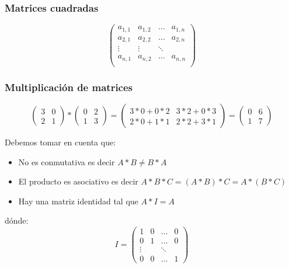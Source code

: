 \subsubsection{Matrices cuadradas}
\[
    \begin{pmatrix}
        a_{1,1} & a_{1, 2} & \dots & a_{1, n} \\
        a_{2,1} & a_{2, 2} & \dots & a_{2, n} \\
        \vdots  & \vdots   & \ddots           \\
        a_{n,1} & a_{n, 2} & \dots & a_{n, n} \\
    \end{pmatrix}
\]

\subsubsection{Multiplicación de matrices}
\[
    {\begin{pmatrix}
        3 & 0 \\
        2 & 1
    \end{pmatrix}}
    *
    {\begin{pmatrix}
        0 & 2 \\
        1 & 3
    \end{pmatrix}}
    =
    {\begin{pmatrix}
        3 * 0 + 0 * 2 & 3 * 2 + 0 * 3 \\
        2 * 0 + 1 * 1 & 2 * 2 + 3 * 1
    \end{pmatrix}}
    =
    {\begin{pmatrix}
        0 & 6 \\
        1 & 7
    \end{pmatrix}}
\]

Debemos tomar en cuenta que:
\begin{itemize}
    \item No es conmutativa es decir $A*B \neq B*A$
    \item El producto es asociativo es decir $A * B * C = (A * B) * C = A * (B * C)$
    \item Hay una matriz identidad tal que $A * I = A$
\end{itemize}

dónde:
\[
    I = \begin{pmatrix}
        1 & 0 & \dots & 0 \\
        0 & 1 & \dots & 0 \\
        \vdots & & \ddots  \\
        0 & 0 & \dots & 1
    \end{pmatrix}
\]

